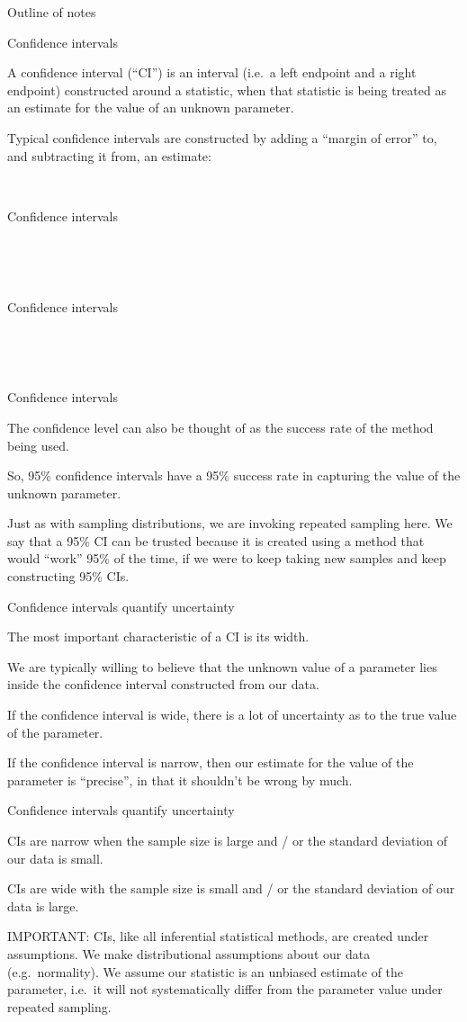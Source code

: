 \documentclass[
  letterpaper,
  DIV=11,
  numbers=noendperiod]{scrreprt}
\begin{document}
Outline of notes

Confidence intervals

A confidence interval (``CI'') is an interval (i.e.~a left endpoint and
a right endpoint) constructed around a statistic, when that statistic is
being treated as an estimate for the value of an unknown parameter.

Typical confidence intervals are constructed by adding a ``margin of
error'' to, and subtracting it from, an estimate:

~

Confidence intervals

~

~

Confidence intervals

~

~

Confidence intervals

The confidence level can also be thought of as the success rate of the
method being used.

So, 95\% confidence intervals have a 95\% success rate in capturing the
value of the unknown parameter.

Just as with sampling distributions, we are invoking repeated sampling
here. We say that a 95\% CI can be trusted because it is created using a
method that would ``work'' 95\% of the time, if we were to keep taking
new samples and keep constructing 95\% CIs.

Confidence intervals quantify uncertainty

The most important characteristic of a CI is its width.

We are typically willing to believe that the unknown value of a
parameter lies inside the confidence interval constructed from our data.

If the confidence interval is wide, there is a lot of uncertainty as to
the true value of the parameter.

If the confidence interval is narrow, then our estimate for the value of
the parameter is ``precise'', in that it shouldn't be wrong by much.

Confidence intervals quantify uncertainty

CIs are narrow when the sample size is large and / or the standard
deviation of our data is small.

CIs are wide with the sample size is small and / or the standard
deviation of our data is large.

IMPORTANT: CIs, like all inferential statistical methods, are created
under assumptions. We make distributional assumptions about our data
(e.g.~normality). We assume our statistic is an unbiased estimate of the
parameter, i.e.~it will not systematically differ from the parameter
value under repeated sampling.
\end{document}
